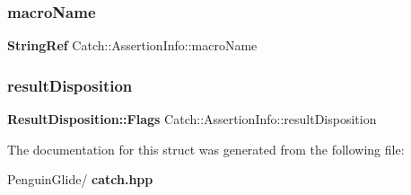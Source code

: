 \subsubsection{macroName}
{\footnotesize\ttfamily \textbf{ String\+Ref} Catch\+::\+Assertion\+Info\+::macro\+Name}

\mbox{\label{struct_catch_1_1_assertion_info_a60353b3632ab2f827162f2b2d6911073}} 
\subsubsection{resultDisposition}
{\footnotesize\ttfamily \textbf{ Result\+Disposition\+::\+Flags} Catch\+::\+Assertion\+Info\+::result\+Disposition}



The documentation for this struct was generated from the following file\+:\begin{DoxyCompactItemize}
\item 
Penguin\+Glide/\textbf{ catch.\+hpp}\end{DoxyCompactItemize}
